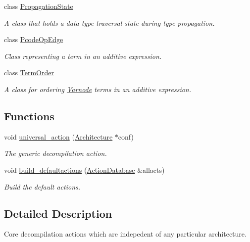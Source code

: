 \begin{DoxyCompactItemize}
class \mbox{\hyperlink{class_propagation_state}{Propagation\+State}}
\begin{DoxyCompactList}\small\item\em A class that holds a data-\/type traversal state during type propagation. \end{DoxyCompactList}\item 
class \mbox{\hyperlink{class_pcode_op_edge}{Pcode\+Op\+Edge}}
\begin{DoxyCompactList}\small\item\em Class representing a {\itshape term} in an additive expression. \end{DoxyCompactList}\item 
class \mbox{\hyperlink{class_term_order}{Term\+Order}}
\begin{DoxyCompactList}\small\item\em A class for ordering \mbox{\hyperlink{class_varnode}{Varnode}} terms in an additive expression. \end{DoxyCompactList}\end{DoxyCompactItemize}
\subsection*{Functions}
\begin{DoxyCompactItemize}
\item 
void \mbox{\hyperlink{coreaction_8hh_a122798abac4d42f44020ef5d71d689e3}{universal\+\_\+action}} (\mbox{\hyperlink{class_architecture}{Architecture}} $\ast$conf)
\begin{DoxyCompactList}\small\item\em The generic decompilation action. \end{DoxyCompactList}\item 
void \mbox{\hyperlink{coreaction_8hh_a5e88524a287b92d8946d5906103df514}{build\+\_\+defaultactions}} (\mbox{\hyperlink{class_action_database}{Action\+Database}} \&allacts)
\begin{DoxyCompactList}\small\item\em Build the default actions. \end{DoxyCompactList}\end{DoxyCompactItemize}


\subsection{Detailed Description}
Core decompilation actions which are indepedent of any particular architecture. 

